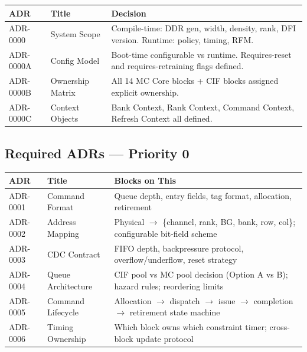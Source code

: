 \documentclass[10pt,a4paper]{article}
\newcommand{\Th}[1]{\cellcolor{thbg}\textbf{\small\color{acc1}#1}}
\newcommand{\RA}{\rowcolor{white}}
\newcommand{\RB}{\rowcolor{altbg}}
\newcommand{\RC}{\rowcolor{acc2lt}}
\begin{document}
\begin{center}
\begin{tabularx}{\linewidth}{@{} l l X @{}}
\toprule
\Th{ADR} & \Th{Title} & \Th{Decision} \\
\midrule
\RA ADR-0000  & System Scope        & Compile-time: DDR gen, width, density, rank, DFI version. Runtime: policy, timing, RFM. \\
\RB ADR-0000A & Config Model        & Boot-time configurable vs runtime. Requires-reset and requires-retraining flags defined. \\
\RA ADR-0000B & Ownership Matrix    & All 14 MC Core blocks + CIF blocks assigned explicit ownership. \\
\RB ADR-0000C & Context Objects     & Bank Context, Rank Context, Command Context, Refresh Context all defined. \\
\bottomrule
\end{tabularx}
\end{center}

\subsection{Required ADRs --- Priority 0}

\begin{center}
\begin{tabularx}{\linewidth}{@{} l l X @{}}
\toprule
\Th{ADR} & \Th{Title} & \Th{Blocks on This} \\
\midrule
\RC ADR-0001 & Command Format      & Queue depth, entry fields, tag format, allocation, retirement \\
\RC ADR-0002 & Address Mapping     & Physical $\to$ \{channel, rank, BG, bank, row, col\}; configurable bit-field scheme \\
\RC ADR-0003 & CDC Contract        & FIFO depth, backpressure protocol, overflow/underflow, reset strategy \\
\RC ADR-0004 & Queue Architecture  & CIF pool vs MC pool decision (Option A vs B); hazard rules; reordering limits \\
\RC ADR-0005 & Command Lifecycle   & Allocation $\to$ dispatch $\to$ issue $\to$ completion $\to$ retirement state machine \\
\RC ADR-0006 & Timing Ownership    & Which block owns which constraint timer; cross-block update protocol \\
\bottomrule
\end{tabularx}
\end{center}
\end{document}
